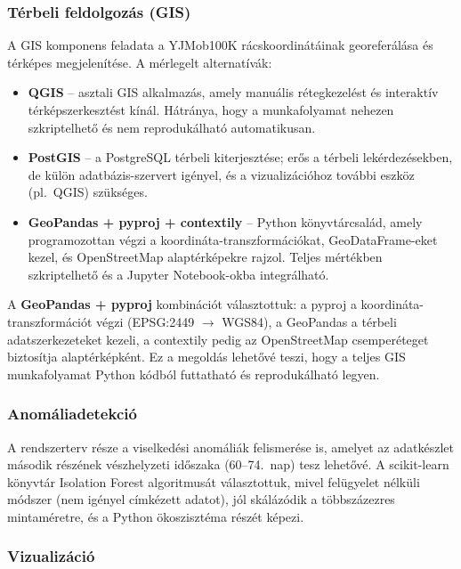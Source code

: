\subsubsection{Térbeli feldolgozás (GIS)}

A GIS komponens feladata a YJMob100K rácskoordinátáinak georeferálása és térképes megjelenítése. A mérlegelt alternatívák:
\begin{itemize}
    \item \textbf{QGIS} -- asztali GIS alkalmazás, amely manuális rétegkezelést és interaktív térképszerkesztést kínál. Hátránya, hogy a munkafolyamat nehezen szkriptelhető és nem reprodukálható automatikusan.
    \item \textbf{PostGIS} -- a PostgreSQL térbeli kiterjesztése; erős a térbeli lekérdezésekben, de külön adatbázis-szervert igényel, és a vizualizációhoz további eszköz (pl.\ QGIS) szükséges.
    \item \textbf{GeoPandas + pyproj + contextily} -- Python könyvtárcsalád, amely programozottan végzi a koordináta-transzformációkat, GeoDataFrame-eket kezel, és OpenStreetMap alaptérképekre rajzol. Teljes mértékben szkriptelhető és a Jupyter Notebook-okba integrálható.
\end{itemize}

A \textbf{GeoPandas + pyproj} kombinációt választottuk: a pyproj a koordináta-transzformációt végzi (EPSG:2449 $\rightarrow$ WGS84), a GeoPandas a térbeli adatszerkezeteket kezeli, a contextily pedig az OpenStreetMap csemperéteget biztosítja alaptérképként. Ez a megoldás lehetővé teszi, hogy a teljes GIS munkafolyamat Python kódból futtatható és reprodukálható legyen.

\subsubsection{Anomáliadetekció}

A rendszerterv része a viselkedési anomáliák felismerése is, amelyet az adatkészlet második részének vészhelyzeti időszaka (60--74.\ nap) tesz lehetővé. A scikit-learn könyvtár Isolation Forest algoritmusát választottuk, mivel felügyelet nélküli módszer (nem igényel címkézett adatot), jól skálázódik a többszázezres mintaméretre, és a Python ökoszisztéma részét képezi.

\subsubsection{Vizualizáció}


